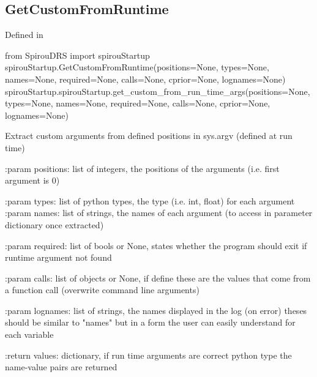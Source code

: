 \begin{minipage}{\textwidth}
\subsection{GetCustomFromRuntime}

Defined in \spirouStartup{}

\begin{pythonbox}
from SpirouDRS import spirouStartup
spirouStartup.GetCustomFromRuntime(positions=None, types=None, names=None,
                                   required=None, calls=None, cprior=None,
                                   lognames=None)
spirouStartup.spirouStartup.get_custom_from_run_time_args(positions=None, types=None, names=None,
                                  required=None, calls=None, cprior=None,
                                  lognames=None)
\end{pythonbox}

\begin{pythondocstring}
Extract custom arguments from defined positions in sys.argv (defined at
run time)

:param positions: list of integers, the positions of the arguments
                  (i.e. first argument is 0)

:param types: list of python types, the type (i.e. int, float) for each
              argument
:param names: list of strings, the names of each argument (to access in
              parameter dictionary once extracted)

:param required: list of bools or None, states whether the program
                 should exit if runtime argument not found

:param calls: list of objects or None, if define these are the values that
              come from a function call (overwrite command line arguments)

:param lognames: list of strings, the names displayed in the log (on error)
                 theses should be similar to "names" but in a form the
                 user can easily understand for each variable

:return values: dictionary, if run time arguments are correct python type
                the name-value pairs are returned
\end{pythondocstring}
\end{minipage}

